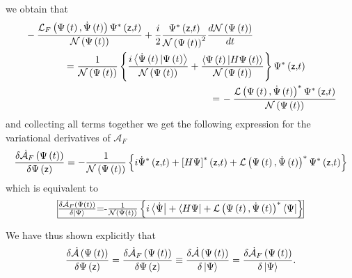 \documentclass[aps,preprint]{revtex4}
\begin{document}
we obtain that 
\begin{align}
& -\frac{\mathcal{L}_{F}\left( \Psi\left( t\right) ,\dot{\Psi}\left(
t\right) \right) \Psi^{\ast}\left( \mathsf{z,}t\right) }{\mathcal{N}\left(
\Psi\left( t\right) \right) }+\frac{i}{2}\frac{\Psi^{\ast}\left( \mathsf{z,}%
t\right) }{\mathcal{N}\left( \Psi\left( t\right) \right) ^{2}}\frac{d%
\mathcal{N}\left( \Psi\left( t\right) \right) }{dt}  \notag \\
& \qquad\qquad\left. =\right. \frac{1}{\mathcal{N}\left( \Psi\left( t\right)
\right) }\left\{ \frac{i\left\langle \dot{\Psi}\left( t\right) |\Psi\left(
t\right) \right\rangle }{\mathcal{N}\left( \Psi\left( t\right) \right) }+%
\frac{\left\langle \Psi\left( t\right) |H\Psi\left( t\right) \right\rangle }{%
\mathcal{N}\left( \Psi\left( t\right) \right) }\right\} \Psi^{\ast}\left( 
\mathsf{z,}t\right)  \notag \\
& \qquad\qquad\qquad\qquad\qquad\quad\qquad\qquad\qquad\qquad\left. =\right.
-\frac{\mathcal{L}\left( \Psi\left( t\right) ,\dot{\Psi}\left( t\right)
\right) ^{\ast}\Psi^{\ast}\left( \mathsf{z,}t\right) }{\mathcal{N}\left(
\Psi\left( t\right) \right) }
\end{align}
and collecting all terms together we get the following expression for the
variational derivatives of $\mathcal{A}_{F}$ 
\begin{equation}
\frac{\delta\mathcal{\dot{A}}_{F}\left( \Psi\left( t\right) \right) }{%
\delta\Psi\left( \mathsf{z}\right) }=-\frac{1}{\mathcal{N}\left( \Psi\left(
t\right) \right) }\left\{ i\dot{\Psi}^{\ast}\left( \mathsf{z,}t\right) +%
\left[ H\Psi\right] ^{\ast}\left( \mathsf{z,}t\right) +\mathcal{L}\left(
\Psi\left( t\right) ,\dot{\Psi}\left( t\right) \right)
^{\ast}\Psi^{\ast}\left( \mathsf{z,}t\right) \right\}
\end{equation}
which is equivalent to 
\begin{equation}
\frame{$\frac{\delta\mathcal{\dot{A}}_F\left( \Psi\left( t\right) \right) }{%
\delta\left| \Psi\right\rangle }$=-$\frac{1}{\mathcal{N}\left( \Psi\left(
t\right) \right) }\left\{ i\left\langle \dot{\Psi}\right| +\left\langle
H\Psi\right| +\mathcal{L}\left( \Psi\left( t\right) ,\dot{\Psi}\left(
t\right) \right) ^\ast\left\langle \Psi\right| \right\} $}
\end{equation}
We have thus shown explicitly that 
\begin{equation}
\frac{\delta\mathcal{\dot{A}}\left( \Psi\left( t\right) \right) }{%
\delta\Psi\left( \mathsf{z}\right) }=\frac{\delta\mathcal{\dot{A}}_{F}\left(
\Psi\left( t\right) \right) }{\delta\Psi\left( \mathsf{z}\right) }\equiv%
\frac{\delta\mathcal{\dot{A}}\left( \Psi\left( t\right) \right) }{%
\delta\left| \Psi\right\rangle }=\frac{\delta\mathcal{\dot{A}}_{F}\left(
\Psi\left( t\right) \right) }{\delta\left| \Psi\right\rangle }.
\end{equation}
\end{document}
